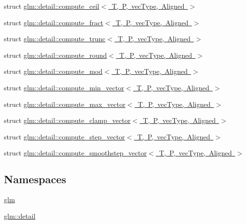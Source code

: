 \begin{DoxyCompactItemize}
\item 
struct \mbox{\hyperlink{structglm_1_1detail_1_1compute__ceil}{glm\+::detail\+::compute\+\_\+ceil$<$ T, P, vec\+Type, Aligned $>$}}
\item 
struct \mbox{\hyperlink{structglm_1_1detail_1_1compute__fract}{glm\+::detail\+::compute\+\_\+fract$<$ T, P, vec\+Type, Aligned $>$}}
\item 
struct \mbox{\hyperlink{structglm_1_1detail_1_1compute__trunc}{glm\+::detail\+::compute\+\_\+trunc$<$ T, P, vec\+Type, Aligned $>$}}
\item 
struct \mbox{\hyperlink{structglm_1_1detail_1_1compute__round}{glm\+::detail\+::compute\+\_\+round$<$ T, P, vec\+Type, Aligned $>$}}
\item 
struct \mbox{\hyperlink{structglm_1_1detail_1_1compute__mod}{glm\+::detail\+::compute\+\_\+mod$<$ T, P, vec\+Type, Aligned $>$}}
\item 
struct \mbox{\hyperlink{structglm_1_1detail_1_1compute__min__vector}{glm\+::detail\+::compute\+\_\+min\+\_\+vector$<$ T, P, vec\+Type, Aligned $>$}}
\item 
struct \mbox{\hyperlink{structglm_1_1detail_1_1compute__max__vector}{glm\+::detail\+::compute\+\_\+max\+\_\+vector$<$ T, P, vec\+Type, Aligned $>$}}
\item 
struct \mbox{\hyperlink{structglm_1_1detail_1_1compute__clamp__vector}{glm\+::detail\+::compute\+\_\+clamp\+\_\+vector$<$ T, P, vec\+Type, Aligned $>$}}
\item 
struct \mbox{\hyperlink{structglm_1_1detail_1_1compute__step__vector}{glm\+::detail\+::compute\+\_\+step\+\_\+vector$<$ T, P, vec\+Type, Aligned $>$}}
\item 
struct \mbox{\hyperlink{structglm_1_1detail_1_1compute__smoothstep__vector}{glm\+::detail\+::compute\+\_\+smoothstep\+\_\+vector$<$ T, P, vec\+Type, Aligned $>$}}
\end{DoxyCompactItemize}
\subsection*{Namespaces}
\begin{DoxyCompactItemize}
\item 
 \mbox{\hyperlink{namespaceglm}{glm}}
\item 
 \mbox{\hyperlink{namespaceglm_1_1detail}{glm\+::detail}}
\end{DoxyCompactItemize}
